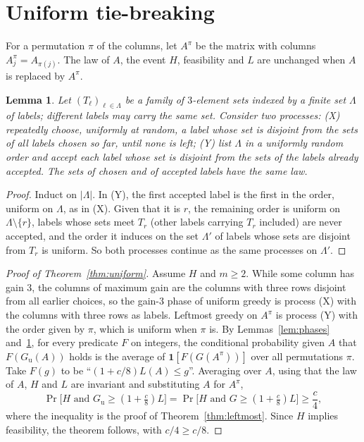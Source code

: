 \documentclass[11pt]{article}
\newtheorem{lemma}[theorem]{Lemma}
\theoremstyle{remark}
\newcommand{\Gu}{G_{\mathrm u}}
\begin{document}
\section{Uniform tie-breaking}\label{sec:uniform}

For a permutation $\pi$ of the columns, let $A^\pi$ be the matrix with
columns $A^\pi_j=A_{\pi(j)}$. The law of $A$, the event $H$, feasibility
and $L$ are unchanged when $A$ is replaced by $A^\pi$.

\begin{lemma}\label{lem:scan}
Let $(T_\ell)_{\ell\in\Lambda}$ be a family of $3$-element sets indexed
by a finite set $\Lambda$ of labels; different labels may carry the same
set. Consider two processes:
(X) repeatedly choose, uniformly at random, a label whose set is disjoint
from the sets of all labels chosen so far, until none is left; (Y) list
$\Lambda$ in a uniformly random order and accept each label whose set is
disjoint from the sets of the labels already accepted. The sets of chosen
and of accepted labels have the same law.
\end{lemma}

\begin{proof}
Induct on $|\Lambda|$. In (Y), the first accepted label is the first in
the order, uniform on $\Lambda$, as in (X). Given that it is $r$, the
remaining order is uniform on $\Lambda\setminus\{r\}$, labels whose sets
meet $T_r$ (other labels carrying $T_r$ included) are never accepted, and
the order it induces on the set $\Lambda'$ of labels whose sets are
disjoint from $T_r$ is uniform. So both processes continue as the same
processes on $\Lambda'$.
\end{proof}

\begin{proof}[Proof of Theorem~\ref{thm:uniform}]
Assume $H$ and $m\ge2$. While some column has gain $3$, the columns of
maximum gain are the columns with three rows disjoint from all earlier
choices, so the gain-$3$ phase of uniform greedy is process (X) with the
columns with three rows as labels. Leftmost greedy on $A^\pi$ is process (Y) with
the order given by $\pi$, which is uniform when $\pi$ is. By
Lemmas~\ref{lem:phases} and~\ref{lem:scan}, for every predicate $F$ on
integers, the conditional probability given $A$ that $F(\Gu(A))$ holds is
the average of $\mathbf 1[F(G(A^\pi))]$ over all permutations $\pi$. Take
$F(g)$ to be ``$(1+c/8)L(A)\le g$''. Averaging over $A$, using that the law
of $A$, $H$ and $L$ are invariant and substituting $A$ for $A^\pi$,
\[
 \Pr\bigl[H\text{ and }\Gu\ge(1+\tfrac c8)L\bigr]
 =\Pr\bigl[H\text{ and }G\ge(1+\tfrac c8)L\bigr]\ge\frac c4,
\]
where the inequality is the proof of Theorem~\ref{thm:leftmost}. Since $H$
implies feasibility, the theorem follows, with $c/4\ge c/8$.
\end{proof}
\end{document}
